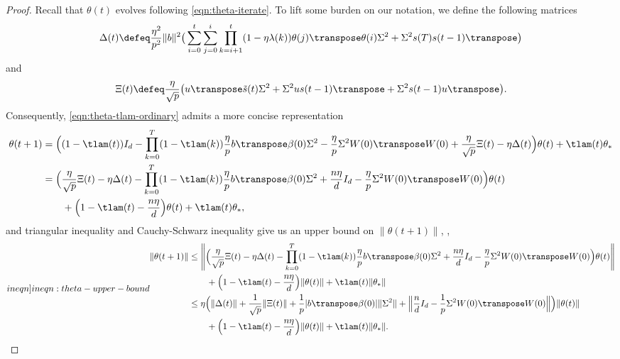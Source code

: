 \begin{proof}
Recall that $\theta(t)$ evolves following \cref{eqn:theta-iterate}.
To lift some burden on our notation, we define the following matrices
\begin{align*}
    \Delta(t) \defeq \frac{\eta^2}{p^2} \|b\|^2\big(\sum_{i=0}^t\sum_{j=0}^i \prod_{k=i+1}^t(1-\eta\lambda(k))\theta(j)\transpose \theta(i) \Sigma^2 + \Sigma^2 s(T) s(t-1)\transpose \big)
\end{align*}
and
\begin{align*}
    \Xi(t) \defeq \frac{\eta}{\sqrt p}\big(u\transpose \tilde{s}(t) \Sigma^2 + \Sigma^2 u s(t-1)\transpose + \Sigma^2 s(t-1)u\transpose\big).
\end{align*}
Consequently, \cref{eqn:theta-tlam-ordinary} admits a more concise representation
\begin{align*}
    \begin{split}
        \theta(t+1) & = \Big((1-\tlam(t))I_d -\prod_{k=0}^T(1-\tlam(k))\frac{\eta}{p}b\transpose\beta(0) \Sigma^2 - \frac{\eta}{p}\Sigma^2 W(0)\transpose W(0) + \frac{\eta}{\sqrt p}\Xi(t) - \eta\Delta(t) \Big)\theta(t) + \tlam(t) \theta_\ast \\
        & = \Big( \frac{\eta}{\sqrt p}\Xi(t) - \eta\Delta(t) - \prod_{k=0}^T (1-\tlam(k)) \frac{\eta}{p} b\transpose\beta(0) \Sigma^2 + \frac{n\eta}{d}I_d - \frac{\eta}{p}\Sigma^2 W(0)\transpose W(0) \Big)\theta(t) \\
        & \qquad + \Big( 1-\tlam(t) - \frac{n\eta}{d} \Big)\theta(t) + \tlam(t) \theta_\ast,
    \end{split}
\end{align*}
and triangular inequality and Cauchy-Schwarz inequality give us an upper bound on $\|\theta(t+1)\|$, \ie,
\begin{align}\label[ineqn]{ineqn:theta-upper-bound}
    \begin{split}
        \|\theta(t+1)\| & \leq \left\| \Big( \frac{\eta}{\sqrt p}\Xi(t) - \eta\Delta(t) - \prod_{k=0}^T(1-\tlam(k))\frac{\eta}{p}b\transpose\beta(0) \Sigma^2 + \frac{n\eta}{d}I_d - \frac{\eta}{p}\Sigma^2 W(0)\transpose W(0) \Big)\theta(t) \right\| \\
        & \qquad + \Big( 1-\tlam(t) - \frac{n\eta}{d} \Big)\|\theta(t)\| + \tlam(t) \|\theta_\ast\| \\
        & \leq \eta \Big( \|\Delta(t)\| + \frac{1}{\sqrt p}\|\Xi(t)\| + \frac{1}{p}|b\transpose\beta(0)| \|\Sigma^2\| + \Big\| \frac{n}{d}I_d - \frac{1}{p}\Sigma^2 W(0)\transpose W(0) \Big\| \Big) \|\theta(t)\| \\
        & \qquad + \Big( 1-\tlam(t) - \frac{n\eta}{d} \Big)\|\theta(t)\| + \tlam(t) \|\theta_\ast\|.

\end{split}
\end{align}
\end{proof}
